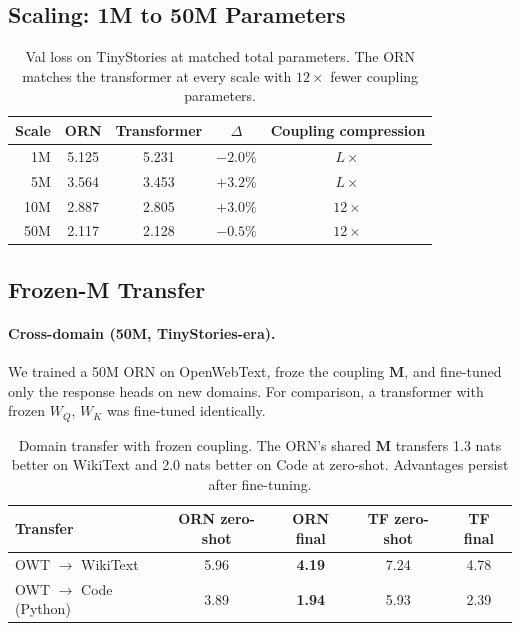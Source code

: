 \documentclass[11pt, a4paper]{article}
\newcommand{\M}{\mathbf{M}}
\theoremstyle{plain}
\theoremstyle{remark}
\begin{document}
\subsection{Scaling: 1M to 50M Parameters}

\begin{table}[h]
\centering\small
\begin{tabular}{@{}rcccc@{}}
\toprule
\textbf{Scale} & \textbf{ORN} & \textbf{Transformer} & \textbf{$\Delta$} & \textbf{Coupling compression} \\
\midrule
1M & 5.125 & 5.231 & $-2.0\%$ & $L\times$ \\
5M & 3.564 & 3.453 & $+3.2\%$ & $L\times$ \\
10M & 2.887 & 2.805 & $+3.0\%$ & $12\times$ \\
50M & 2.117 & 2.128 & $-0.5\%$ & $12\times$ \\
\bottomrule
\end{tabular}
\caption{Val loss on TinyStories at matched total parameters. The ORN matches the transformer at every scale with $12\times$ fewer coupling parameters.}
\end{table}

\subsection{Frozen-M Transfer}

\paragraph{Cross-domain (50M, TinyStories-era).}
We trained a 50M ORN on OpenWebText, froze the coupling $\M$, and fine-tuned only the response heads on new domains.
For comparison, a transformer with frozen $W_Q$, $W_K$ was fine-tuned identically.

\begin{table}[h]
\centering\small
\begin{tabular}{@{}lcccc@{}}
\toprule
\textbf{Transfer} & \textbf{ORN zero-shot} & \textbf{ORN final} & \textbf{TF zero-shot} & \textbf{TF final} \\
\midrule
OWT $\to$ WikiText & 5.96 & \textbf{4.19} & 7.24 & 4.78 \\
OWT $\to$ Code (Python) & 3.89 & \textbf{1.94} & 5.93 & 2.39 \\
\bottomrule
\end{tabular}
\caption{Domain transfer with frozen coupling. The ORN's shared $\M$ transfers 1.3 nats better on WikiText and 2.0 nats better on Code at zero-shot. Advantages persist after fine-tuning.}
\end{table}
\end{document}
